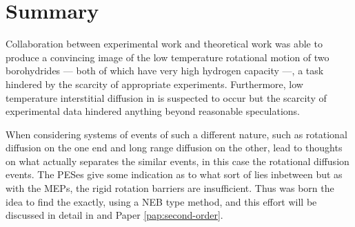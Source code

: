 \section{Summary}
\label{sec:borohydrides-summary}

Collaboration between experimental work and theoretical work was able to produce a convincing image of the low temperature rotational motion of two borohydrides --- both of which have very high hydrogen capacity ---, a task hindered by the scarcity of appropriate experiments.
Furthermore, low temperature  interstitial diffusion in  is suspected to occur but the scarcity of experimental data hindered anything beyond reasonable speculations.

When considering systems of events of such a different nature, such as rotational diffusion on the one end and long range diffusion on the other, lead to thoughts on what actually separates the similar events, in this case the rotational diffusion events.
The PESes give some indication as to what sort of  lies inbetween but as with the MEPs, the rigid rotation barriers are insufficient.
Thus was born the idea to find the  exactly, using a NEB type method, and this effort will be discussed in detail in  and Paper \ref{pap:second-order}.
